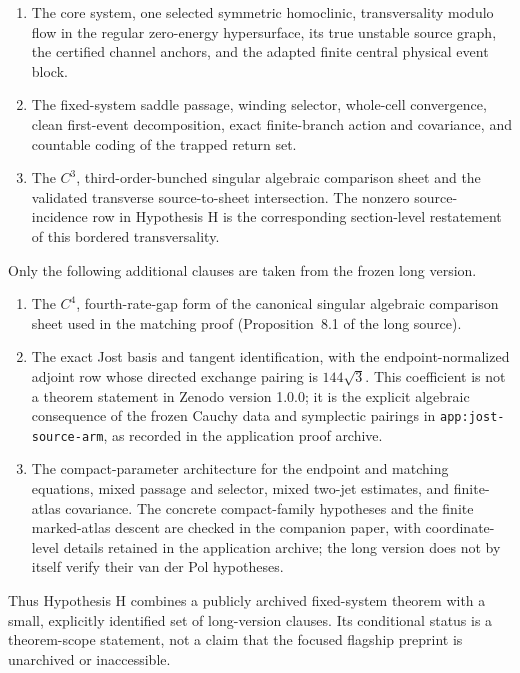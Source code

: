 \documentclass[11pt,reqno]{amsart}
\begin{document}
\begin{enumerate}
 \item The core system, one selected symmetric homoclinic, transversality
 modulo flow in the regular zero-energy hypersurface, its true unstable
 source graph, the certified channel anchors, and the adapted finite central
 physical event block.
 \item The fixed-system saddle passage, winding selector, whole-cell
 convergence, clean first-event decomposition, exact finite-branch action and
 covariance, and countable coding of the trapped return set.
 \item The $C^3$, third-order-bunched singular algebraic comparison sheet and
 the validated transverse source-to-sheet intersection.  The nonzero
 source-incidence row in Hypothesis H is the corresponding section-level
 restatement of this bordered transversality.
\end{enumerate}

Only the following additional clauses are taken from the frozen long version.

\begin{enumerate}
 \item The $C^4$, fourth-rate-gap form of the canonical singular algebraic
 comparison sheet used in the matching proof (Proposition~8.1 of the long
 source).
 \item The exact Jost basis and tangent identification, with the
 endpoint-normalized adjoint row whose directed exchange pairing is
 $144\sqrt3$.  This coefficient is not a theorem statement in Zenodo version
 1.0.0; it is the explicit algebraic consequence of the frozen Cauchy data and
 symplectic pairings in \texttt{app:jost-source-arm}, as recorded in the
 application proof archive.
 \item The compact-parameter architecture for the endpoint and matching
 equations, mixed passage and selector, mixed two-jet estimates, and
 finite-atlas covariance.  The concrete compact-family hypotheses and the
 finite marked-atlas descent are checked in the companion paper, with
 coordinate-level details retained in the application archive; the long
 version does not by itself verify their van der Pol hypotheses.
\end{enumerate}

Thus Hypothesis H combines a publicly archived fixed-system theorem with a small,
explicitly identified set of long-version clauses.  Its conditional status is
a theorem-scope statement, not a claim that the focused flagship preprint is
unarchived or inaccessible.
\end{document}
